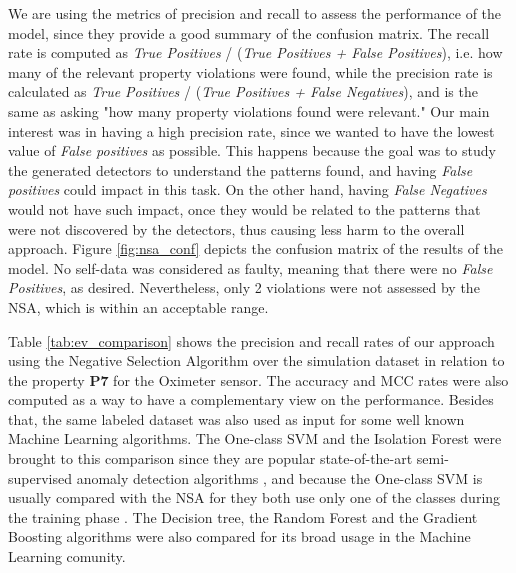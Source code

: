 We are using the metrics of precision and recall to assess the performance of the model, since they provide a good summary of the confusion matrix. The recall rate is computed as \textit{True Positives} / (\textit{True Positives + False Positives}), i.e. how many of the relevant property violations were found, while the precision rate is calculated as \textit{True Positives} / (\textit{True Positives + False Negatives}), and is the same as asking "how many property violations found were relevant." Our main interest was in having a high precision rate, since we wanted to have the lowest value of \textit{False positives} as possible. This happens because the goal was to study the generated detectors to understand the patterns found, and having \textit{False positives} could impact in this task. On the other hand, having \textit{False Negatives} would not have such impact, once they would be related to the patterns that were not discovered by the detectors, thus causing less harm to the overall approach. Figure \ref{fig:nsa_conf} depicts the confusion matrix of the results of the model. No self-data was considered as faulty, meaning that there were no \textit{False Positives}, as desired. Nevertheless, only 2 violations were not assessed by the NSA, which is within an acceptable range.


Table \ref{tab:ev_comparison} shows the precision and recall rates of our approach using the Negative Selection Algorithm over the simulation dataset in relation to the property \textbf{P7} for the Oximeter sensor. The accuracy and MCC rates were also computed as a way to have a complementary view on the performance. Besides that, the same labeled dataset was also used as input for some well known Machine Learning algorithms. The One-class SVM and the Isolation Forest were brought to this comparison since they are popular state-of-the-art semi-supervised anomaly detection algorithms \cite{villa2021semi}, and because the One-class SVM is usually compared with the NSA for they both use only one of the classes during the training phase \cite{NSAResearch2021}. The Decision tree, the Random Forest and the Gradient Boosting algorithms  \cite{prajwala2015comparative, bentejac2021comparative} were also compared for its broad usage in the Machine Learning comunity. 

